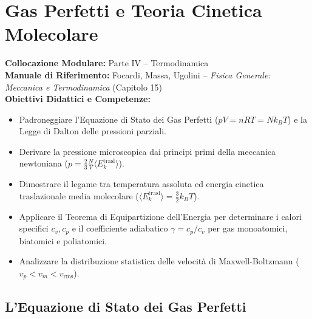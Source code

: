 \chapter{Gas Perfetti e Teoria Cinetica Molecolare}
\label{chap:gas_ideali_teoria_cinetica}

\begin{tcolorbox}[enhanced, breakable, colback=navyblue!4!white, colframe=navyblue!80!black,
    coltitle=white, fonttitle=\bfseries\sffamily, title={Quadro Sinottico del Capitolo 13},
    sharp corners, rounded corners=south, boxrule=1pt]
\textbf{Collocazione Modulare:} Parte IV -- Termodinamica\\
\textbf{Manuale di Riferimento:} Focardi, Massa, Ugolini -- \emph{Fisica Generale: Meccanica e Termodinamica} (Capitolo 15)\\
\textbf{Obiettivi Didattici e Competenze:}\par
\begin{itemize}
    \item Padroneggiare l'Equazione di Stato dei Gas Perfetti ($p V = n R T = N k_B T$) e la Legge di Dalton delle pressioni parziali.
    \item Derivare la pressione microscopica dai principi primi della meccanica newtoniana ($p = \frac{2}{3}\frac{N}{V}\langle E_k^{\text{trasl}}\rangle$).
    \item Dimostrare il legame tra temperatura assoluta ed energia cinetica traslazionale media molecolare ($\langle E_k^{\text{trasl}}\rangle = \frac{3}{2}k_B T$).
    \item Applicare il Teorema di Equipartizione dell'Energia per determinare i calori specifici $c_v, c_p$ e il coefficiente adiabatico $\gamma = c_p/c_v$ per gas monoatomici, biatomici e poliatomici.
    \item Analizzare la distribuzione statistica delle velocità di Maxwell-Boltzmann ($v_p < v_m < v_{\text{rms}}$).
\end{itemize}
\end{tcolorbox}

\vspace{0.5em}

\section{L'Equazione di Stato dei Gas Perfetti}
\label{sec:equazione_gas_perfetti}

